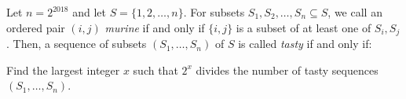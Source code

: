 Let $n=2^{2018}$ and let $S=\{1,2,\ldots,n\}$. For subsets $S_1,S_2,\ldots,S_n\subseteq S$, we call an ordered pair $(i,j)$ \emph{murine} if and only if $\{i,j\}$ is a subset of at least one of $S_i, S_j$. Then, a sequence of subsets $(S_1,\ldots, S_n)$ of $S$ is called \emph{tasty} if and only if:

\begin{enumerate}
\end{enumerate}
Find the largest integer $x$ such that $2^x$ divides the number of tasty sequences $(S_1,\ldots, S_n)$.
